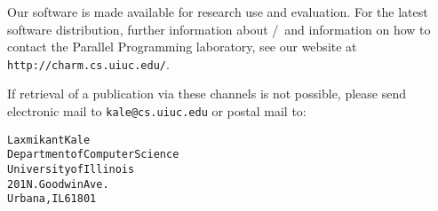 Our software is made available for research use and evaluation.
For the latest software distribution, further information about
\converse{}/\charmpp\ and information on how to contact the Parallel
Programming laboratory, see our website at \texttt{http://charm.cs.uiuc.edu/}.

If retrieval of a publication via these channels is not possible,
please send electronic mail to \texttt{kale@cs.uiuc.edu} or postal mail to:

\begin{alltt}
   Laxmikant Kale
   Department of Computer Science 
   University of Illinois 
   201 N. Goodwin Ave.
   Urbana, IL 61801 
\end{alltt}

